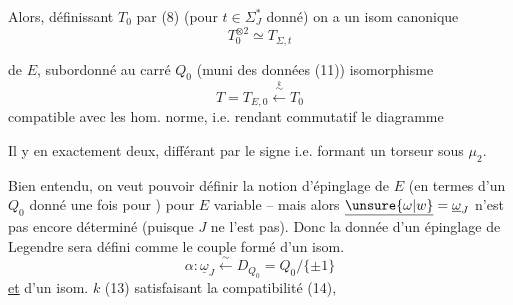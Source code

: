 Alors, définissant $T_0$ par (8) (pour $t\in\Sigma_{J}^\ast$ donné) on a un isom canonique
\[
T_0^{\otimes2}\simeq T_{\Sigma,t}\tag*{(12)}
\]

  de $E$, subordonné au carré $Q_0$ (muni des données (11))   isomorphisme
\[
T=T_{E,0}\xleftarrow{\overset{k}{\sim}}T_0 \tag*{(13)}
\]
compatible avec les hom. norme, i.e. rendant commutatif le diagramme

Il y en exactement deux, différant par le signe i.e. formant un torseur sous $\mu_2$.

Bien entendu, on veut pouvoir définir la notion d'épinglage de $E$ (en termes d'un $Q_0$ donné une fois pour ) pour $E$ variable -- mais alors $\underline{\unsure{\omega|w}}=\underline\omega_J$ n'est pas encore déterminé (puisque $J$ ne l'est pas). Donc la donnée d'un épinglage de Legendre sera défini comme le couple  formé d'un isom.
\[
\alpha:\underline\omega_J\xleftarrow{\sim}D_{Q_0}=Q_0/\{\pm1\} \tag*{(15)}
\]
\uline{et} d'un isom. $k$ (13) satisfaisant la compatibilité (14),
